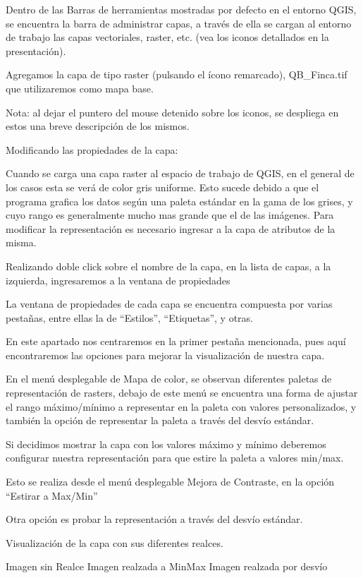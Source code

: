 \documentclass[]{article}
\begin{document}
Dentro de las Barras de herramientas mostradas por defecto en el entorno QGIS, se encuentra la barra de administrar capas, a través de ella se cargan al entorno de trabajo las capas vectoriales, raster, etc. (vea los iconos detallados en la presentación).

Agregamos la capa de tipo raster (pulsando el ícono remarcado), QB\_Finca.tif que utilizaremos como mapa base.


Nota: al dejar el puntero del mouse detenido sobre los iconos, se despliega en estos una breve descripción de los mismos.

Modificando las propiedades de la capa:

Cuando se carga una capa raster al espacio de trabajo de QGIS, en el general de los casos esta se verá de color gris uniforme. 
Esto sucede debido a que el programa grafica los datos según una paleta estándar en la gama de los grises, y cuyo rango es generalmente mucho mas grande que el de las imágenes. 
Para modificar la representación es necesario ingresar a la capa de atributos de la misma. 

Realizando doble click sobre el nombre de la capa, en la lista de capas, a la izquierda, ingresaremos a la ventana de propiedades

La ventana de propiedades de cada capa se encuentra compuesta por varias pestañas, entre ellas la de “Estilos”, “Etiquetas”, y otras.

En este apartado nos centraremos en la primer pestaña mencionada, pues aquí encontraremos  las opciones para mejorar la visualización de nuestra capa.

En el menú desplegable de Mapa de color, se observan diferentes paletas de representación de rasters, debajo de este menú se encuentra una forma de ajustar el rango máximo/mínimo a representar en la paleta con valores personalizados, y también la opción de representar la paleta a través del desvío estándar.  

Si decidimos mostrar la capa con los valores máximo y mínimo deberemos configurar nuestra representación para que estire la paleta a valores min/max. 

Esto se realiza desde el menú desplegable Mejora de Contraste, en la opción “Estirar a Max/Min”

Otra opción es probar la representación a través del desvío estándar.

Visualización de la capa con sus diferentes realces. 


Imagen sin Realce			Imagen realzada a MinMax	     Imagen realzada por desvío 
\end{document}
